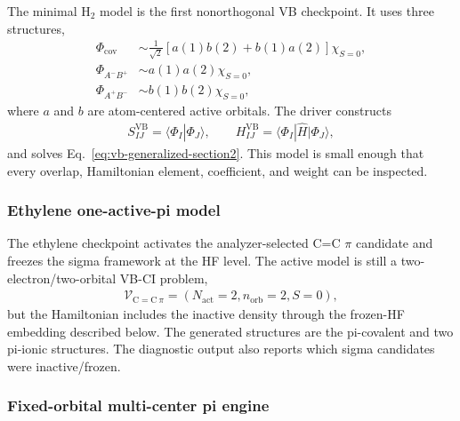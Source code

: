 \documentclass[11pt]{article}
\newcommand{\vb}{\mathrm{VB}}
\begin{document}
The minimal H$_2$ model is the first nonorthogonal VB checkpoint.  It uses three structures,
\begin{equation}
\begin{aligned}
	\Phi_{\mathrm{cov}} &\sim \frac{1}{\sqrt{2}}
	\left[a(1)b(2)+b(1)a(2)\right]\chi_{S=0}, \\
	\Phi_{A^-B^+} &\sim a(1)a(2)\chi_{S=0}, \\
	\Phi_{A^+B^-} &\sim b(1)b(2)\chi_{S=0},
\end{aligned}
\end{equation}
where $a$ and $b$ are atom-centered active orbitals.  The driver constructs
\begin{equation}
\begin{aligned}
	S_{IJ}^{\vb}=\langle\Phi_I|\Phi_J\rangle,
	\qquad
	H_{IJ}^{\vb}=\langle\Phi_I|\hat{H}|\Phi_J\rangle,
\end{aligned}
\end{equation}
and solves Eq.~\eqref{eq:vb-generalized-section2}.  This model is small enough that every overlap, Hamiltonian element, coefficient, and weight can be inspected.

\subsubsection*{Ethylene one-active-pi model}

The ethylene checkpoint activates the analyzer-selected C=C $\pi$ candidate and freezes the sigma framework at the HF level.  The active model is still a two-electron/two-orbital VB-CI problem,
\begin{equation}
\begin{aligned}
	\mathcal{V}_{\mathrm{C=C}\ \pi}
	= \left(N_{\mathrm{act}}=2,
	n_{\mathrm{orb}}=2,
	S=0\right),
\end{aligned}
\end{equation}
but the Hamiltonian includes the inactive density through the frozen-HF embedding described below.  The generated structures are the pi-covalent and two pi-ionic structures.  The diagnostic output also reports which sigma candidates were inactive/frozen.

\subsubsection*{Fixed-orbital multi-center pi engine}
\end{document}
